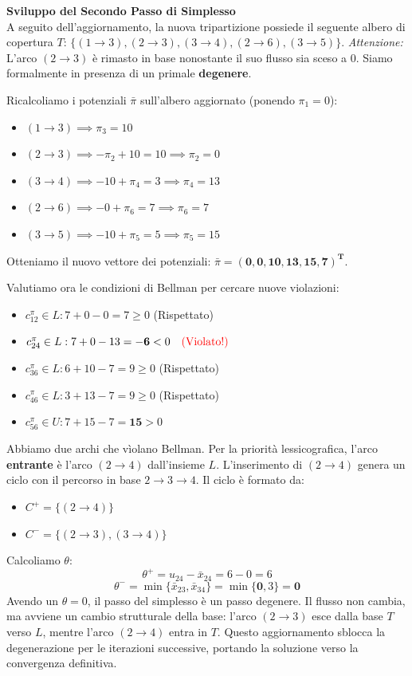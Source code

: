 \documentclass[12pt, a4paper]{article}
\begin{document}
	\textbf{Sviluppo del Secondo Passo di Simplesso}\\
	A seguito dell'aggiornamento, la nuova tripartizione possiede il seguente albero di copertura $T$: $\{(1\to3), (2\to3), (3\to4), (2\to6), (3\to5)\}$.
	\textit{Attenzione:} L'arco $(2\to3)$ è rimasto in base nonostante il suo flusso sia sceso a 0. Siamo formalmente in presenza di un primale \textbf{degenere}.
	
	Ricalcoliamo i potenziali $\bar{\pi}$ sull'albero aggiornato (ponendo $\pi_1 = 0$):
	\begin{itemize}
		\item $(1\to3) \implies \pi_3 = 10$
		\item $(2\to3) \implies -\pi_2 + 10 = 10 \implies \pi_2 = 0$
		\item $(3\to4) \implies -10 + \pi_4 = 3 \implies \pi_4 = 13$
		\item $(2\to6) \implies -0 + \pi_6 = 7 \implies \pi_6 = 7$
		\item $(3\to5) \implies -10 + \pi_5 = 5 \implies \pi_5 = 15$
	\end{itemize}
	Otteniamo il nuovo vettore dei potenziali: $\bar{\pi} = \mathbf{(0, 0, 10, 13, 15, 7)^T}$.
	
	Valutiamo ora le condizioni di Bellman per cercare nuove violazioni:
	\begin{itemize}
		\item $c^\pi_{12} \in L: 7 + 0 - 0 = 7 \ge 0$ (Rispettato)
		\item $c^\pi_{24} \in L: 7 + 0 - 13 = \mathbf{-6} < 0 \quad \text{\textcolor{red}{(Violato!)}}$
		\item $c^\pi_{36} \in L: 6 + 10 - 7 = 9 \ge 0$ (Rispettato)
		\item $c^\pi_{46} \in L: 3 + 13 - 7 = 9 \ge 0$ (Rispettato)
		\item $c^\pi_{56} \in U: 7 + 15 - 7 = \mathbf{15} > 0 \quad$ \text{\textcolor{red}{(Violato!)}}
	\end{itemize}
	Abbiamo due archi che vìolano Bellman. Per la priorità lessicografica, l'arco \textbf{entrante} è l'arco $(2\to4)$ dall'insieme $L$.
	L'inserimento di $(2\to4)$ genera un ciclo con il percorso in base $2 \to 3 \to 4$.
	Il ciclo è formato da:
	\begin{itemize}
		\item $C^+ = \{ (2\to4) \}$
		\item $C^- = \{ (2\to3), (3\to4) \}$
	\end{itemize}
	Calcoliamo $\theta$:
	\[ \theta^+ = u_{24} - \bar{x}_{24} = 6 - 0 = 6 \]
	\[ \theta^- = \min \{ \bar{x}_{23}, \bar{x}_{34} \} = \min \{ \mathbf{0}, 3 \} = \mathbf{0} \]
	Avendo un $\theta = 0$, il passo del simplesso è un passo degenere. Il flusso non cambia, ma avviene un cambio strutturale della base: l'arco $(2\to3)$ esce dalla base $T$ verso $L$, mentre l'arco $(2\to4)$ entra in $T$. Questo aggiornamento sblocca la degenerazione per le iterazioni successive, portando la soluzione verso la convergenza definitiva.
	
\end{document}
